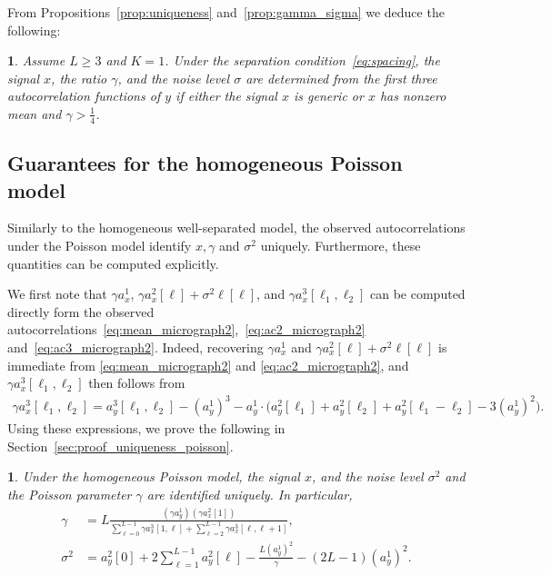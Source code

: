 \documentclass[12pt]{article}
\newcommand{\1}{\mathbf{1}}
\theoremstyle{plain}
\theoremstyle{definition}
\theoremstyle{remark}
\theoremstyle{plain}
\theoremstyle{remark}
\theoremstyle{plain}
\newtheorem{corollary}[thm]{\protect\corollaryname}
\theoremstyle{plain}
\theoremstyle{plain}
\newtheorem{proposition}[thm]{\protect\propositionname}
\providecommand{\corollaryname}{Corollary}
\providecommand{\propositionname}{Proposition}
\numberwithin{equation}{section}
\begin{document}
From Propositions~\ref{prop:uniqueness} and~\ref{prop:gamma_sigma} we   deduce the following:
\begin{corollary}
	Assume $L \geq 3$ and $K=1$.
	Under the separation condition~\eqref{eq:spacing}, the signal $x$, the ratio $\gamma$, and the noise level $\sigma$ are determined from the first three autocorrelation functions of $y$ if either the signal $x$ is generic or $x$ has nonzero mean  and $\gamma > \frac{1}{4}$.
\end{corollary}
%


\subsection{Guarantees for the homogeneous Poisson model} \label{sec:theory_homogeneous_poisson}

Similarly to the homogeneous well-separated model, the observed autocorrelations under the Poisson model identify $x,\gamma$ and $\sigma^2$ uniquely. Furthermore, these quantities can be computed explicitly. 

We first note that $\gamma a_x^1$, $\gamma a_x^2[\ell] + \sigma^2 \ell[\ell]$, and $\gamma a_x^3[\ell_1,\ell_2]$ can be computed directly form the observed autocorrelations~\eqref{eq:mean_micrograph2},~\eqref{eq:ac2_micrograph2} and~\eqref{eq:ac3_micrograph2}.
 Indeed, recovering  $\gamma a_x^1$ and $\gamma a_x^2[\ell] + \sigma^2 \ell[\ell]$ is immediate from \eqref{eq:mean_micrograph2} and \eqref{eq:ac2_micrograph2}, and $\gamma a_x^3[\ell_1,\ell_2]$ then follows from
%
\begin{align}
\gamma a_x^3[\ell_1,\ell_2]
= a_y^3[\ell_1,\ell_2] - (a_y^1)^3
- a_y^1 \cdot \big(a_y^2[\ell_1]  
+ a_y^2[\ell_2] + a_y^2[\ell_1-\ell_2]- 3(a_y^1)^2 \big).
\end{align}
Using these expressions, we prove the following in Section~\ref{sec:proof_uniqueness_poisson}.
\begin{proposition} \label{prop:uniqueness_poisson}
Under the homogeneous Poisson model, the signal $x$, and the noise level $\sigma^2$ and the Poisson parameter $\gamma$ are identified uniquely. 
In particular, 
	\begin{align}
\gamma &= L \frac{(\gamma a_y^1) (\gamma a_x^2[1])}
{\sum_{\ell=0}^{L-1} \gamma a_x^3[1,\ell] 
	+ \sum_{\ell=2}^{L-1} \gamma a_x^3[\ell,\ell+1]}, \\
\sigma^2 &= a_y^2[0] + 2\sum_{\ell = 1}^{L-1}a_y^2[\ell]-\frac{L (a^1_y)^2}{\gamma}
- (2 L - 1) (a_y^1)^2.
\end{align}
\end{proposition}
\end{document}
